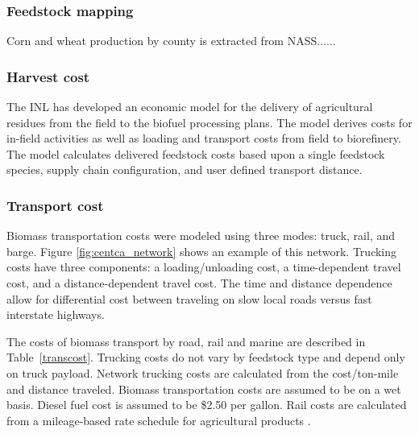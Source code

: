 \documentclass[review,3p,authoryear,times]{elsarticle}
\begin{document}
\subsubsection{Feedstock mapping}
Corn and wheat production by county is extracted from NASS......

\subsubsection{Harvest cost}
 The \ac{INL} has developed an economic model for the delivery of agricultural residues from the field to the biofuel processing plans. The model derives costs for in-field activities as well as loading and transport costs from field to biorefinery.  The model calculates delivered feedstock costs based upon a single feedstock species, supply chain configuration, and user defined  transport distance.
\subsubsection{Transport cost}
Biomass transportation costs were modeled using three modes: truck, rail, and barge.  Figure \ref{fig:centca_network} shows an example of this network. Trucking costs have three components: a loading/unloading cost, a time-dependent travel cost, and a distance-dependent travel cost.  The time and distance dependence allow for differential cost between traveling on slow local roads versus fast interstate highways.  

The costs of biomass transport by road, rail  and marine are described in Table~\ref{transcost}.  Trucking costs \citep{Jenkins2000,Perlack2003,Reynolds2002} do not vary by feedstock type and depend only on truck payload. Network trucking costs are calculated from the cost/ton-mile and distance traveled. Biomass transportation costs are assumed to be on a wet basis.  Diesel fuel cost is assumed to be  \$2.50 per gallon.  Rail costs are calculated from a  mileage-based rate schedule for agricultural products \citep{Railroad2007}. 
\end{document}
